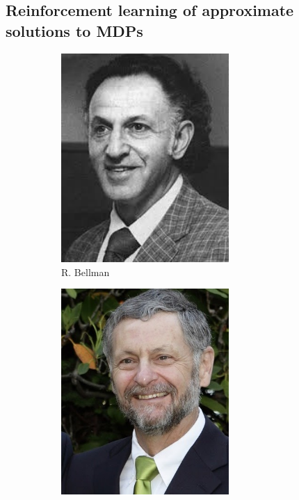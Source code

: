 \subsection{Reinforcement learning of approximate solutions to MDPs}\label{sec:rl}
\begin{figure}
    \centering
    \begin{subfigure}[b]{0.22\textwidth}
        \centering
        \includegraphics[width=0.7\textwidth]{images/images_intro/bellman.jpeg}
        \caption{R. Bellman}
    \end{subfigure}
    \hfill
    \begin{subfigure}[b]{0.22\textwidth}
        \centering
        \includegraphics[width=0.7\textwidth]{images/images_intro/puterman.jpg}

\end{subfigure}
\end{figure}
